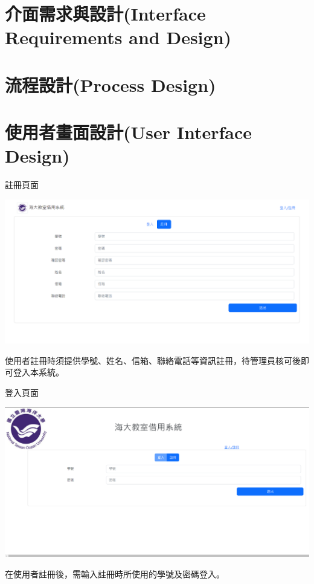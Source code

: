 \documentclass{article}
\begin{document}
\newpage

\section[介面需求與設計(INTERFACE REQUIREMENTS AND DESIGN)]{介面需求與設計(Interface Requirements and Design)}

\newpage

\section[流程設計(PROCESS DESIGN)]{流程設計(Process Design)}

\newpage

\section[使用者畫面設計(USER INTERFACE DESIGN)]{使用者畫面設計(User Interface Design)}


	\bigskip
	\begin{Large}
		註冊頁面
	\end{Large}
	
	\begin{center}
		\includegraphics[height=0.35\textheight]{SDDRegister.png}
	\end{center}
	使用者註冊時須提供學號、姓名、信箱、聯絡電話等資訊註冊，待管理員核可後即可登入本系統。

	\bigskip
	\bigskip

	\begin{Large}
		登入頁面
	\end{Large}

	\begin{center}
		\includegraphics[height=0.35\textheight]{SDDLogin.png}
	\end{center}
	在使用者註冊後，需輸入註冊時所使用的學號及密碼登入。
	\newpage
	
\end{document}
